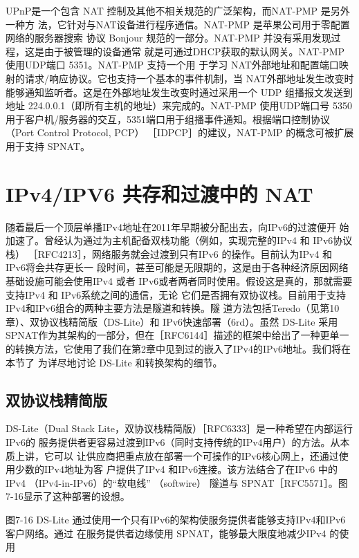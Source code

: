 UPnP是一个包含 NAT 控制及其他不相关规范的广泛架构，而NAT-PMP 是另外一种方
法，它针对与NAT设备进行程序通信。NAT-PMP 是苹果公司用于零配置网络的服务器搜索
协议 Bonjour 规范的一部分。NAT-PMP 并没有采用发现过程，这是由于被管理的设备通常
就是可通过DHCP获取的默认网关。NAT-PMP 使用UDP端口 5351。NAT-PMP 支持一个用
于学习 NAT外部地址和配置端口映射的请求/响应协议。它也支持一个基本的事件机制，当
NAT外部地址发生改变时能够通知监听者。这是在外部地址发生改变时通过采用一个 UDP
组播报文发送到地址 224.0.0.1（即所有主机的地址）来完成的。NAT-PMP 使用UDP端口号
5350用于客户机/服务器的交互，5351端口用于组播事件通知。根据端口控制协议（Port
Control Protocol, PCP） ［IDPCP］的建议，NAT-PMP 的概念可被扩展用于支持 SPNAT。

\section{IPv4/IPV6 共存和过渡中的 NAT}

随着最后一个顶层单播IPv4地址在2011年早期被分配出去，向IPv6的过渡便开
始加速了。曾经认为通过为主机配备双栈功能（例如，实现完整的IPv4 和 IPv6协议栈）
［RFC4213］，网络服务就会过渡到只有IPv6 的操作。目前认为IPv4 和 IPv6将会共存更长一
段时间，甚至可能是无限期的，这是由于各种经济原因网络基础设施可能会使用IPv4 或者
IPv6或者两者同时使用。假设这是真的，那就需要支持IPv4 和 IPv6系统之间的通信，无论
它们是否拥有双协议栈。目前用于支持IPv4和IPv6组合的两种主要方法是隧道和转换。隧
道方法包括Teredo（见第10章）、双协议栈精简版（DS-Lite）和 IPv6快速部署（6rd）。虽然
DS-Lite 采用SPNAT作为其架构的一部分，但在［RFC6144］描述的框架中给出了一种更单一
的转换方法，它使用了我们在第2章中见到过的嵌入了IPv4的IPv6地址。我们将在本节了
为详尽地讨论 DS-Lite 和转换架构的细节。

\subsection{双协议栈精简版}

DS-Lite（Dual Stack Lite，双协议栈精简版）［RFC6333］是一种希望在内部运行IPv6的
服务提供者更容易过渡到IPv6（同时支持传统的IPv4用户）的方法。从本质上讲，它可以
让供应商把重点放在部署一个可操作的IPv6核心网上，还通过使用少数的IPv4地址为客
户提供了IPv4 和IPv6连接。该方法结合了在IPv6 中的IPv4 （IPv4-in-IPv6）的“软电线”
（softwire） 隧道与 SPNAT［RFC5571］。图7-16显示了这种部署的设想。

图7-16
DS-Lite 通过使用一个只有IPv6的架构使服务提供者能够支持IPv4和IPv6 客户网络。通过
在服务提供者边缘使用 SPNAT，能够最大限度地减少IPv4 的使用

